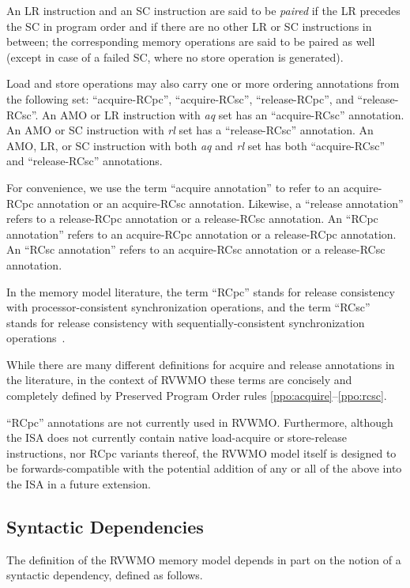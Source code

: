 An LR instruction and an SC instruction are said to be {\em paired} if the LR precedes the SC in program order and if there are no other LR or SC instructions in between; the corresponding memory operations are said to be paired as well (except in case of a failed SC, where no store operation is generated).

Load and store operations may also carry one or more ordering annotations from the following set: ``acquire-RCpc'', ``acquire-RCsc'', ``release-RCpc'', and ``release-RCsc''.
An AMO or LR instruction with {\em aq} set has an ``acquire-RCsc'' annotation.
An AMO or SC instruction with {\em rl} set has a ``release-RCsc'' annotation.
An AMO, LR, or SC instruction with both {\em aq} and {\em rl} set has both ``acquire-RCsc'' and ``release-RCsc'' annotations.

For convenience, we use the term ``acquire annotation'' to refer to an acquire-RCpc annotation or an acquire-RCsc annotation.
Likewise, a ``release annotation'' refers to a release-RCpc annotation or a release-RCsc annotation.
An ``RCpc annotation'' refers to an acquire-RCpc annotation or a release-RCpc annotation.
An ``RCsc annotation'' refers to an acquire-RCsc annotation or a release-RCsc annotation.

\begin{commentary}
  In the memory model literature, the term ``RCpc'' stands for release consistency with processor-consistent synchronization operations, and the term ``RCsc'' stands for release consistency with sequentially-consistent synchronization operations~\cite{Gharachorloo90memoryconsistency}.

  While there are many different definitions for acquire and release annotations in the literature, in the context of RVWMO these terms are concisely and completely defined by Preserved Program Order rules \ref{ppo:acquire}--\ref{ppo:rcsc}.

  ``RCpc'' annotations are not currently used in RVWMO.  Furthermore, although the ISA does not currently contain native load-acquire or store-release instructions, nor RCpc variants thereof, the RVWMO model itself is designed to be forwards-compatible with the potential addition of any or all of the above into the ISA in a future extension.
\end{commentary}

\subsection*{Syntactic Dependencies}
\label{sec:memorymodel:dependencies}
The definition of the RVWMO memory model depends in part on the notion of a syntactic dependency, defined as follows.

